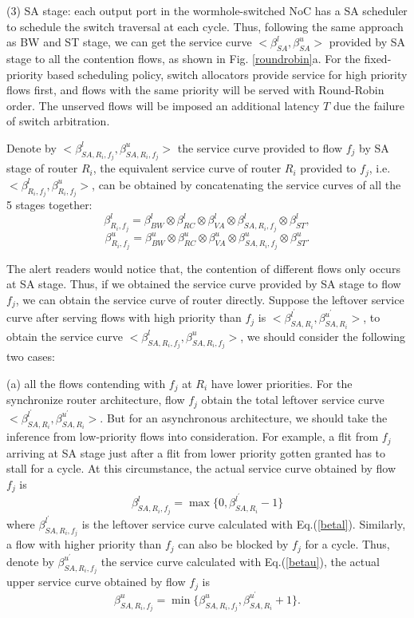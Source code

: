 \documentclass[10pt,journal]{IEEEtran}
\begin{document}
(3) SA stage: each output port in the wormhole-switched NoC has a SA scheduler to schedule the switch traversal at each cycle. Thus, following the same approach as BW and ST stage, we can get the service curve $<\beta_{SA}^l,\beta_{SA}^u>$ provided by SA stage to all the contention flows, as shown in Fig. \ref{roundrobin}a. For the fixed-priority based scheduling policy, switch allocators provide service for high priority flows first, and flows with the same priority will be served with Round-Robin order. The unserved flows will be imposed an additional latency $T$ due the failure of switch arbitration.

Denote by $<\beta_{SA,R_i,f_j}^l,\beta_{SA,R_i,f_j}^u>$ the service curve provided to flow $f_j$ by SA stage of router $R_i$, the equivalent service curve of router $R_i$ provided to $f_j$, i.e. $<\beta_{R_i,f_j}^l,\beta_{R_i,f_j}^u>$, can be obtained by concatenating the service curves of all the 5 stages together:
$$\beta_{R_i,f_j}^l=\beta_{BW}^l\otimes\beta_{RC}^l\otimes\beta_{VA}^l\otimes\beta_{SA,R_i,f_j}^l\otimes \beta_{ST}^l,$$
$$\beta_{R_i,f_j}^u=\beta_{BW}^u\otimes\beta_{RC}^u\otimes\beta_{VA}^u\otimes\beta_{SA,R_i,f_j}^u\otimes \beta_{ST}^u.$$

The alert readers would notice that, the contention of different flows only occurs at SA stage. Thus, if we obtained the service curve provided by SA stage to flow $f_j$, we can obtain the service curve of router directly. Suppose the leftover service curve after serving flows with high priority than $f_j$ is $<\beta_{SA,R_i}^{l^\prime},\beta_{SA,R_i}^{u^\prime}>$, to obtain the service curve $<\beta_{SA,R_i,f_j}^l,\beta_{SA,R_i,f_j}^u>$, we should consider the following two cases:

(a) all the flows contending with $f_j$ at $R_i$ have lower priorities. For the synchronize router architecture, flow $f_j$ obtain the total leftover service curve $<\beta_{SA,R_i}^{l^\prime},\beta_{SA,R_i}^{u^\prime}>$. But for an asynchronous architecture, we should take the inference from low-priority flows into consideration. For example, a flit from $f_j$ arriving at SA stage just after a flit from lower priority gotten granted has to stall for a cycle. At this circumstance, the actual service curve obtained by flow $f_j$ is
\begin{equation}\label{nonpreemptbetal}
\beta^{l}_{SA,R_i,f_j}=\max\{0,\beta^{l^\prime}_{SA,R_i}-1\}
\end{equation}
where $\beta^{l^\prime}_{SA,R_i,f_j}$ is the leftover service curve calculated with Eq.(\ref{betal}). Similarly, a flow with higher priority than $f_j$ can also be blocked by $f_j$ for a cycle. Thus, denote by $\beta^{u^\prime}_{SA,R_i,f_j}$ the service curve calculated with Eq.(\ref{betau}), the actual upper service curve obtained by flow $f_j$ is
\begin{equation}\label{nonpreemptbetau}
\beta^{u}_{SA,R_i,f_j}=\min\{\beta^{u}_{SA,R_i,f_j},\beta^{u^\prime}_{SA,R_i}+1\}.
\end{equation}
\end{document}
